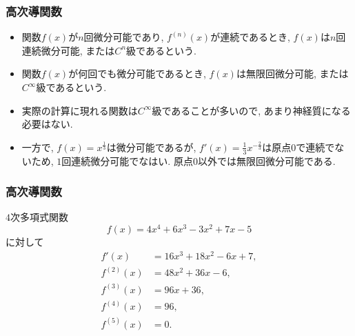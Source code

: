\begin{frame}
\frametitle{高次導関数}


\begin{Def}
\begin{itemize}
\item 関数$f(x)$が$n$回微分可能であり, $f^{(n)}(x)$が連続であるとき, $f(x)$は$n$回連続微分可能, または$C^n$級であるという. 
\item 関数$f(x)$が何回でも微分可能であるとき, $f(x)$は無限回微分可能, または$C^\infty$級であるという. 
\end{itemize}
\end{Def}

\begin{itemize}
\item 実際の計算に現れる関数は$C^\infty$級であることが多いので, あまり神経質になる必要はない. 
\item 一方で, $f(x)=x^{\frac{1}{3}}$は微分可能であるが, $f'(x)=\frac{1}{3}x^{-\frac{2}{3}}$は原点$0$で連続でないため, $1$回連続微分可能でなはい. 
原点$0$以外では無限回微分可能である. 
\end{itemize}

\end{frame}









\begin{frame}
\frametitle{高次導関数}


$4$次多項式関数
$$
f(x)= 4x^4+6x^3-3x^2+7x-5
$$
に対して
\begin{align*}
f'(x) & = 16x^3+18x^2-6x+7, \\
f^{(2)}(x) & = 48x^2+36x-6, \\
f^{(3)}(x) & = 96x+36, \\
f^{(4)}(x) & = 96, \\
f^{(5)}(x) & = 0. 
\end{align*}


\end{frame}







